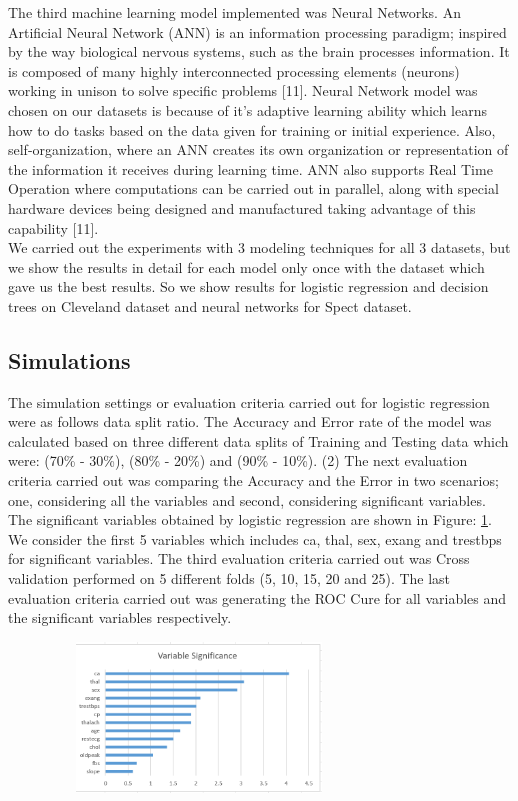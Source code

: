 \documentclass[conference]{IEEEtran}
\begin{document}
The third machine learning model implemented was Neural Networks. An Artificial Neural Network (ANN) is an information processing paradigm; inspired by the way biological nervous systems, such as the brain processes information. It is composed of many highly interconnected processing elements (neurons) working in unison to solve specific problems [11]. Neural Network model was chosen on our datasets is because of it’s adaptive learning ability which learns how to do tasks based on the data given for training or initial experience. Also, self-organization, where an ANN creates its own organization or representation of the information it receives during learning time. ANN also supports Real Time Operation where computations can be carried out in parallel, along with special hardware devices being designed and manufactured taking advantage of this capability [11].\\

We carried out the experiments with 3 modeling techniques for all 3 datasets, but we show the results in detail for each model only once with the dataset which gave us the best results. So we show results for logistic regression and decision trees on Cleveland dataset and neural networks for Spect dataset.

\subsection{Simulations}
The simulation settings or evaluation criteria carried out for logistic regression were as follows data split ratio. The Accuracy and Error rate of the model was calculated based on three different data splits of Training and Testing data which were: (70\% - 30\%), (80\% - 20\%) and (90\% - 10\%). (2) The next evaluation criteria carried out was comparing the Accuracy and the Error in two scenarios; one, considering all the variables and second, considering significant variables. The significant variables obtained by logistic regression are shown in Figure: \ref{fig3}. We consider the first 5 variables which includes ca, thal, sex, exang and trestbps for significant variables. The third evaluation criteria carried out was Cross validation performed on 5 different folds (5, 10, 15, 20 and 25). The last evaluation criteria carried out was generating the ROC Cure for all variables and the significant variables respectively.

\begin{figure}
	\centering
	\includegraphics[height=4cm, width=8cm]{images/Fig3}
	\linebreak
	\label{fig3}
\end{figure}
\end{document}
